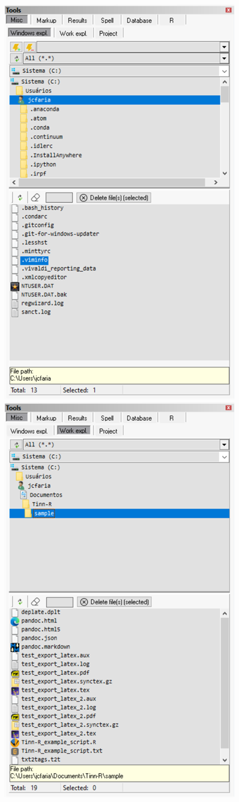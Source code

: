\begin{figure}[H]
  \includegraphics[scale=0.6]{./res/tools_misc_windowsexpl.png}~~
  \includegraphics[scale=0.6]{./res/tools_misc_workexpl.png}~~

\end{figure}
